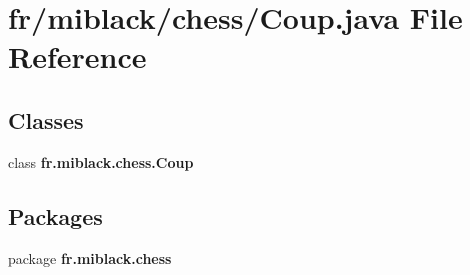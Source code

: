\section{fr/miblack/chess/\-Coup.java File Reference}
\label{Coup_8java}
\subsection*{Classes}
\begin{DoxyCompactItemize}
\item 
class {\bf fr.\-miblack.\-chess.\-Coup}
\end{DoxyCompactItemize}
\subsection*{Packages}
\begin{DoxyCompactItemize}
\item 
package {\bf fr.\-miblack.\-chess}
\end{DoxyCompactItemize}
